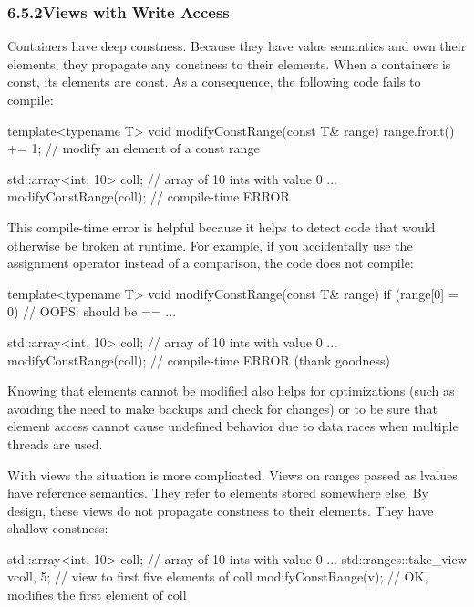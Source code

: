 \subsubsection*{ 6.5.2\hspace{0.2cm}Views with Write Access}

Containers have deep constness. Because they have value semantics and own their elements, they propagate any constness to their elements. When a containers is const, its elements are const. As a consequence, the following code fails to compile:

\begin{cpp}
template<typename T>
void modifyConstRange(const T& range)
{
	range.front() += 1; // modify an element of a const range
}

std::array<int, 10> coll{}; // array of 10 ints with value 0
...
modifyConstRange(coll); // compile-time ERROR
\end{cpp}

This compile-time error is helpful because it helps to detect code that would otherwise be broken at runtime. For example, if you accidentally use the assignment operator instead of a comparison, the code does not compile:

\begin{cpp}
template<typename T>
void modifyConstRange(const T& range)
{
	if (range[0] = 0) { // OOPS: should be ==
		...
	}
}

std::array<int, 10> coll{}; // array of 10 ints with value 0
...
modifyConstRange(coll); // compile-time ERROR (thank goodness)
\end{cpp}

Knowing that elements cannot be modified also helps for optimizations (such as avoiding the need to make backups and check for changes) or to be sure that element access cannot cause undefined behavior due to data races when multiple threads are used.

With views the situation is more complicated. Views on ranges passed as lvalues have reference semantics. They refer to elements stored somewhere else. By design, these views do not propagate constness to their elements. They have shallow constness:

\begin{cpp}
std::array<int, 10> coll{}; // array of 10 ints with value 0
...
std::ranges::take_view v{coll, 5}; // view to first five elements of coll
modifyConstRange(v); // OK, modifies the first element of coll
\end{cpp}

